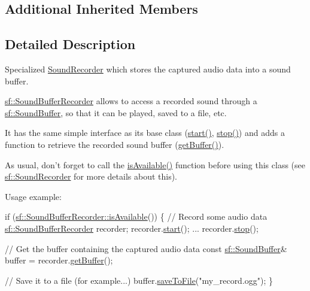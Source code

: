 \subsection*{Additional Inherited Members}


\subsection{Detailed Description}
Specialized \hyperlink{classsf_1_1_sound_recorder}{Sound\+Recorder} which stores the captured audio data into a sound buffer. 

\hyperlink{classsf_1_1_sound_buffer_recorder}{sf\+::\+Sound\+Buffer\+Recorder} allows to access a recorded sound through a \hyperlink{classsf_1_1_sound_buffer}{sf\+::\+Sound\+Buffer}, so that it can be played, saved to a file, etc.

It has the same simple interface as its base class (\hyperlink{classsf_1_1_sound_recorder_a777e633114f7221cd7554a6ed486259e}{start()}, \hyperlink{classsf_1_1_sound_recorder_a8d9c8346aa9aa409cfed4a1101159c4c}{stop()}) and adds a function to retrieve the recorded sound buffer (\hyperlink{classsf_1_1_sound_buffer_recorder_a84fd636ad22f434bafe2a7c15a8e5107}{get\+Buffer()}).

As usual, don't forget to call the \hyperlink{classsf_1_1_sound_recorder_aab2bd0fee9e48d6cfd449b1cb078ce5a}{is\+Available()} function before using this class (see \hyperlink{classsf_1_1_sound_recorder}{sf\+::\+Sound\+Recorder} for more details about this).

Usage example\+: 
\begin{DoxyCode}
\textcolor{keywordflow}{if} (\hyperlink{classsf_1_1_sound_recorder_aab2bd0fee9e48d6cfd449b1cb078ce5a}{sf::SoundBufferRecorder::isAvailable}())
\{
    \textcolor{comment}{// Record some audio data}
    \hyperlink{classsf_1_1_sound_buffer_recorder}{sf::SoundBufferRecorder} recorder;
    recorder.\hyperlink{classsf_1_1_sound_recorder_a777e633114f7221cd7554a6ed486259e}{start}();
    ...
    recorder.\hyperlink{classsf_1_1_sound_recorder_a8d9c8346aa9aa409cfed4a1101159c4c}{stop}();

    \textcolor{comment}{// Get the buffer containing the captured audio data}
    \textcolor{keyword}{const} \hyperlink{classsf_1_1_sound_buffer}{sf::SoundBuffer}& buffer = recorder.\hyperlink{classsf_1_1_sound_buffer_recorder_a84fd636ad22f434bafe2a7c15a8e5107}{getBuffer}();

    \textcolor{comment}{// Save it to a file (for example...)}
    buffer.\hyperlink{classsf_1_1_sound_buffer_ab2083dc1a934c64959d9e3f162328a76}{saveToFile}(\textcolor{stringliteral}{"my\_record.ogg"});
\}
\end{DoxyCode}


